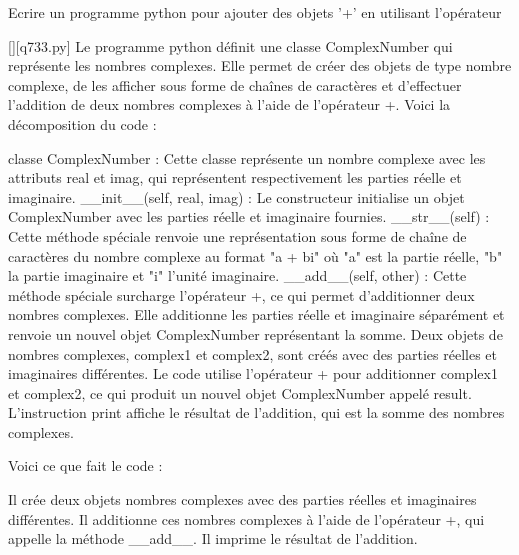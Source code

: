         \question
        Ecrire un programme python pour ajouter des objets '+' en utilisant l'opérateur
        \par
        \begin{solution}
            \renewcommand{\nomfichier}{q733.py}
            \pythonfile{\chemincode \nomfichier}[][\nomfichier]
            Le programme python définit une classe ComplexNumber qui représente les nombres complexes. Elle permet de créer des objets de type nombre complexe, de les afficher sous forme de chaînes de caractères et d'effectuer l'addition de deux nombres complexes à l'aide de l'opérateur +. Voici la décomposition du code :

    classe ComplexNumber : Cette classe représente un nombre complexe avec les attributs real et imag, qui représentent respectivement les parties réelle et imaginaire.
    \_\_init\_\_(self, real, imag) : Le constructeur initialise un objet ComplexNumber avec les parties réelle et imaginaire fournies.
    \_\_str\_\_(self) : Cette méthode spéciale renvoie une représentation sous forme de chaîne de caractères du nombre complexe au format "a + bi" où "a" est la partie réelle, "b" la partie imaginaire et "i" l'unité imaginaire.
    \_\_add\_\_(self, other) : Cette méthode spéciale surcharge l'opérateur +, ce qui permet d'additionner deux nombres complexes. Elle additionne les parties réelle et imaginaire séparément et renvoie un nouvel objet ComplexNumber représentant la somme.
    Deux objets de nombres complexes, complex1 et complex2, sont créés avec des parties réelles et imaginaires différentes.
    Le code utilise l'opérateur + pour additionner complex1 et complex2, ce qui produit un nouvel objet ComplexNumber appelé result.
    L'instruction print affiche le résultat de l'addition, qui est la somme des nombres complexes.

Voici ce que fait le code :

    Il crée deux objets nombres complexes avec des parties réelles et imaginaires différentes.
    Il additionne ces nombres complexes à l'aide de l'opérateur +, qui appelle la méthode \_\_add\_\_.
    Il imprime le résultat de l'addition.
        \end{solution}
        

